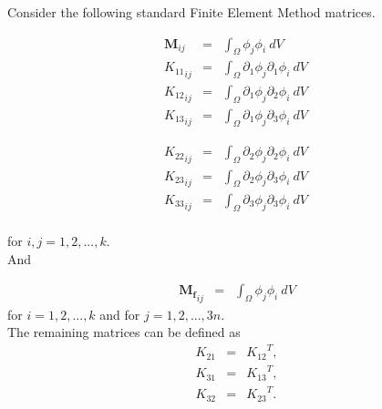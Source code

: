 	Consider the following standard Finite Element Method matrices.

	\noindent\begin{minipage}{.5\linewidth}
		\begin{eqnarray*}
			\mathbf{M}_{ij} & = & \int_{\Omega} \phi_j \phi_i \ dV \ \\
			{K_{11}}_{ij} & = & \int_{\Omega} \partial_1\phi_j \partial_1\phi_i \ dV \  \\
			{K_{12}}_{ij} & = & \int_{\Omega} \partial_1\phi_j \partial_2\phi_i \ dV \ \\
			{K_{13}}_{ij} & = & \int_{\Omega} \partial_1\phi_j \partial_3\phi_i \ dV \ 
		\end{eqnarray*}
	\end{minipage}%
	\begin{minipage}{.5\linewidth}
		\begin{eqnarray*}
			{K_{22}}_{ij} & = & \int_{\Omega} \partial_2\phi_j \partial_2\phi_i \ dV \  \\
			{K_{23}}_{ij} & = & \int_{\Omega} \partial_2\phi_j \partial_3\phi_i \ dV \ \\
			{K_{33}}_{ij} & = & \int_{\Omega} \partial_3\phi_j \partial_3\phi_i \ dV \ \\
		\end{eqnarray*}
	\end{minipage}
	for $i,j = 1,2,...,k.$\\

	And

	\begin{eqnarray*}
		\mathbf{M_f}_{ij} & = & \int_{\Omega} \phi_j \phi_i \ dV
	\end{eqnarray*}
	for $i = 1,2,...,k$ and for $j = 1,2,...,3n.$\\

	The remaining matrices can be defined as
	\begin{eqnarray*}
		{K_{21}} & = & {K_{12}}^{T},\\
		{K_{31}} & = & {K_{13}}^{T}, \\
		{K_{32}} & = & {K_{23}}^{T}. \\
	\end{eqnarray*}

